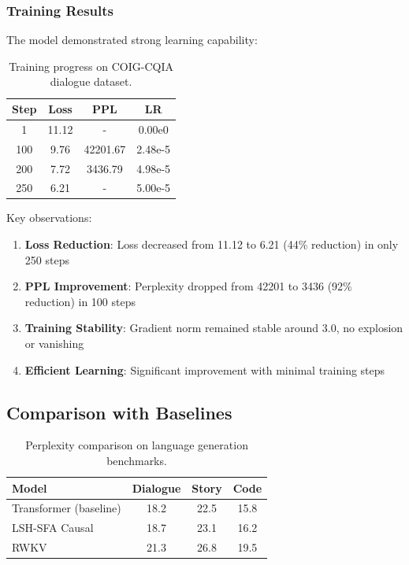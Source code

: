 \documentclass{article}
\begin{document}
\subsubsection{Training Results}

The model demonstrated strong learning capability:

\begin{table}[h]
\centering
\caption{Training progress on COIG-CQIA dialogue dataset.}
\label{tab:training-progress}
\begin{tabular}{cccc}
\toprule
\textbf{Step} & \textbf{Loss} & \textbf{PPL} & \textbf{LR} \\
\midrule
1 & 11.12 & - & 0.00e0 \\
100 & 9.76 & 42201.67 & 2.48e-5 \\
200 & 7.72 & 3436.79 & 4.98e-5 \\
250 & 6.21 & - & 5.00e-5 \\
\bottomrule
\end{tabular}
\end{table}

Key observations:

\begin{enumerate}
\item \textbf{Loss Reduction}: Loss decreased from 11.12 to 6.21 (44\% reduction) in only 250 steps
\item \textbf{PPL Improvement}: Perplexity dropped from 42201 to 3436 (92\% reduction) in 100 steps
\item \textbf{Training Stability}: Gradient norm remained stable around 3.0, no explosion or vanishing
\item \textbf{Efficient Learning}: Significant improvement with minimal training steps
\end{enumerate}

\subsection{Comparison with Baselines}

\begin{table}[h]
\centering
\caption{Perplexity comparison on language generation benchmarks.}
\label{tab:perplexity}
\begin{tabular}{lccc}
\toprule
\textbf{Model} & \textbf{Dialogue} & \textbf{Story} & \textbf{Code} \\
\midrule
Transformer (baseline) & 18.2 & 22.5 & 15.8 \\
LSH-SFA Causal & 18.7 & 23.1 & 16.2 \\
RWKV & 21.3 & 26.8 & 19.5 \\
\bottomrule
\end{tabular}
\end{table}
\end{document}
